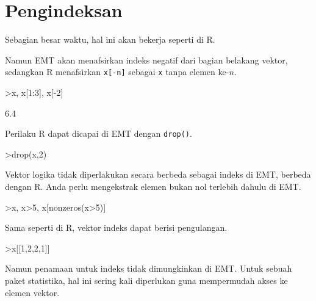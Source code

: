 \documentclass[a4paper,11pt,oneside,enabledeprecatedfontcommands]{scrbook}
\newenvironment{eulernotebook}{}{}
\newcommand{\eulerheading}[1]{\chapter{#1}}
\newenvironment{eulercomment}{\par\medskip\noindent}{\par\medskip}
\begin{document}
\begin{eulernotebook}
		\eulerheading{Pengindeksan}
		\begin{eulercomment}
			Sebagian besar waktu, hal ini akan bekerja seperti di R.
			
			Namun EMT akan menafsirkan indeks negatif dari bagian belakang vektor, sedangkan R menafsirkan \texttt{x[-n]}
			sebagai \texttt{x} tanpa elemen ke-$n$.
		\end{eulercomment}
		\begin{eulerprompt}
			>x, x[1:3], x[-2]
		\end{eulerprompt}
		\begin{euleroutput}
			[10.4,  5.6,  3.1,  6.4,  21.7]
			[10.4,  5.6,  3.1]
			6.4
		\end{euleroutput}
		\begin{eulercomment}
			Perilaku R dapat dicapai di EMT dengan \texttt{drop()}.
		\end{eulercomment}
		\begin{eulerprompt}
			>drop(x,2)
		\end{eulerprompt}
		\begin{euleroutput}
			[10.4,  3.1,  6.4,  21.7]
		\end{euleroutput}
		\begin{eulercomment}
			Vektor logika tidak diperlakukan secara berbeda sebagai indeks di EMT, berbeda dengan R. Anda perlu
			mengekstrak elemen bukan nol terlebih dahulu di EMT.
		\end{eulercomment}
		\begin{eulerprompt}
			>x, x>5, x[nonzeros(x>5)]
		\end{eulerprompt}
		\begin{euleroutput}
			[10.4,  5.6,  3.1,  6.4,  21.7]
			[1,  1,  0,  1,  1]
			[10.4,  5.6,  6.4,  21.7]
		\end{euleroutput}
		\begin{eulercomment}
			Sama seperti di R, vektor indeks dapat berisi pengulangan.
		\end{eulercomment}
		\begin{eulerprompt}
			>x[[1,2,2,1]]
		\end{eulerprompt}
		\begin{euleroutput}
			[10.4,  5.6,  5.6,  10.4]
		\end{euleroutput}
		\begin{eulercomment}
			Namun penamaan untuk indeks tidak dimungkinkan di EMT. Untuk sebuah paket statistika, hal ini sering
			kali diperlukan guna mempermudah akses ke elemen vektor.
			

\end{eulercomment}
\end{eulernotebook}
\end{document}
